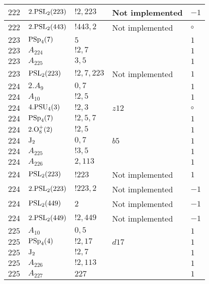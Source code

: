 \documentclass[a4paper, 11pt]{article}
\begin{document}
\begin{longtable}{lllll}
        $ 222 $ & $ 2.{\rm PSL}_{2}(223) $ & $ !2, 223 $ &  Not implemented & $ -1$ \\ \hline
        $ 222 $ & $ 2.{\rm PSL}_{2}(443) $ & $ !443, 2 $ &  Not implemented &  $\circ$ \\ \hline
        $ 223 $ & $ {\rm PSp}_{4}(7) $ & $ 5 $ & $ ~ $ & $ 1$ \\ \hline
        $ 223 $ & $ A_{224} $ & $ !2, 7 $ & $ ~ $ & $ 1$ \\ \hline
        $ 223 $ & $ A_{225} $ & $ 3, 5 $ & $ ~ $ & $ 1$ \\ \hline
        $ 223 $ & $ {\rm PSL}_{2}(223) $ & $ !2, 7, 223 $ &  Not implemented & $ 1$ \\ \hline
        $ 224 $ & $ 2.A_{9} $ & $ 0,7 $ & $ ~ $ & $ 1$ \\ \hline
        $ 224 $ & $ A_{10} $ & $ ! 2,5 $ & $ ~ $ & $ 1$ \\ \hline
        $ 224 $ & $ 4.{\rm PSU}_{4}(3) $ & $ ! 2,3 $ & $ z12 $ &  $\circ$ \\ \hline
        $ 224 $ & $ {\rm PSp}_{4}(7) $ & $ ! 2,5,7 $ & $ ~ $ & $ 1$ \\ \hline
        $ 224 $ & $ 2.{\rm O}_{8}^+(2) $ & $ ! 2,5 $ & $ ~ $ & $ 1$ \\ \hline
        $ 224 $ & $ {\rm J}_2 $ & $ 0,7 $ & $ b5 $ & $ 1$ \\ \hline
        $ 224 $ & $ A_{225} $ & $ !3, 5 $ & $ ~ $ & $ 1$ \\ \hline
        $ 224 $ & $ A_{226} $ & $ 2, 113 $ & $ ~ $ & $ 1$ \\ \hline
        $ 224 $ & $ {\rm PSL}_{2}(223) $ & $ !223 $ &  Not implemented & $ 1$ \\ \hline
        $ 224 $ & $ 2.{\rm PSL}_{2}(223) $ & $ !223, 2 $ &  Not implemented & $ -1$ \\ \hline
        $ 224 $ & $ {\rm PSL}_{2}(449) $ & $ 2 $ &  Not implemented & $ -1$ \\ \hline
        $ 224 $ & $ 2.{\rm PSL}_{2}(449) $ & $ !2, 449 $ &  Not implemented & $ -1$ \\ \hline
        $ 225 $ & $ A_{10} $ & $ 0,5 $ & $ ~ $ & $ 1$ \\ \hline
        $ 225 $ & $ {\rm PSp}_{4}(4) $ & $ ! 2,17 $ & $ d17 $ & $ 1$ \\ \hline
        $ 225 $ & $ {\rm J}_2 $ & $ ! 2,7 $ & $ ~ $ & $ 1$ \\ \hline
        $ 225 $ & $ A_{226} $ & $ !2, 113 $ & $ ~ $ & $ 1$ \\ \hline
        $ 225 $ & $ A_{227} $ & $ 227 $ & $ ~ $ & $ 1$ \\ \hline

\end{longtable}
\end{document}
